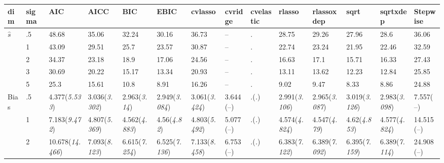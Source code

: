 \documentclass{article}
\begin{document}
\begin{table}[tbp] \centering
{}

{\tiny
\begin{tabularx}{\textwidth}{lCCCCCCCCCCCCC}

\toprule
{dim}&{sigma}&{AIC}&{AICC}&{BIC}&{EBIC}&{cvlasso}&{cvridge}&{cvelastic}&{rlasso}&{rlassoxdep}&{sqrt}&{sqrtxdep}&{Stepwise} \tabularnewline
\midrule\addlinespace[1.5ex]
$\hat{s}$&.5&48.68&35.06&32.24&30.16&36.73&--&.&28.75&29.26&27.96&28.6&36.06 \tabularnewline
&1&43.09&29.51&25.7&23.57&30.87&--&.&22.74&23.24&21.95&22.46&32.59 \tabularnewline
&2&34.37&23.18&18.9&17.06&24.56&--&.&16.63&17.1&15.71&16.33&27.43 \tabularnewline
&3&30.69&20.22&15.17&13.34&20.93&--&.&13.11&13.62&12.23&12.84&25.85 \tabularnewline
&5&25.3&15.61&10.8&8.91&16.26&--&.&9.02&9.47&8.33&8.86&24.88 \tabularnewline
\midrule Bias&.5&4.377\newline (\emph{5.533})&3.036\newline (\emph{3.302})&2.963\newline (\emph{3.14})&2.949\newline (\emph{3.084})&3.061\newline (\emph{3.424})&3.644\newline (--)&.\newline (\emph{.})&2.991\newline (\emph{3.106})&2.965\newline (\emph{3.087})&3.019\newline (\emph{3.126})&2.983\newline (\emph{3.098})&7.557\newline (--) \tabularnewline
&1&7.183\newline (\emph{9.472})&4.807\newline (\emph{5.369})&4.562\newline (\emph{4.883})&4.56\newline (\emph{4.82})&4.803\newline (\emph{5.492})&5.077\newline (--)&.\newline (\emph{.})&4.574\newline (\emph{4.824})&4.547\newline (\emph{4.79})&4.62\newline (\emph{4.853})&4.577\newline (\emph{4.824})&14.515\newline (--) \tabularnewline
&2&10.678\newline (\emph{14.466})&7.093\newline (\emph{8.123})&6.615\newline (\emph{7.254})&6.525\newline (\emph{7.136})&7.133\newline (\emph{8.458})&6.753\newline (--)&.\newline (\emph{.})&6.383\newline (\emph{7.122})&6.389\newline (\emph{7.092})&6.395\newline (\emph{7.159})&6.389\newline (\emph{7.114})&24.908\newline (--) \tabularnewline

\end{tabularx}}
\end{table}
\end{document}
